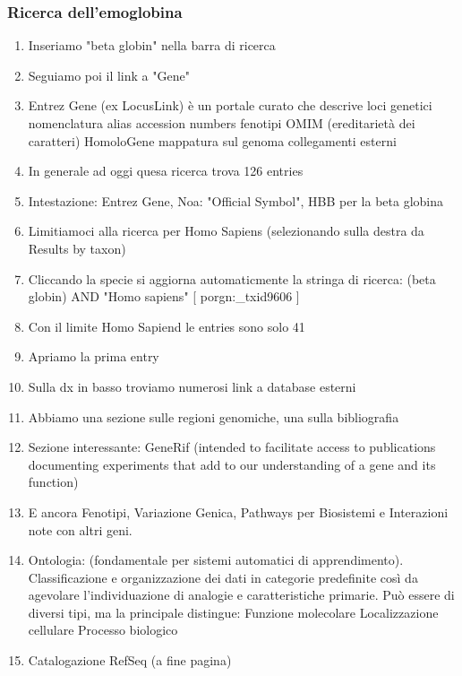 \documentclass{article}
\begin{document}
\subsubsection*{Ricerca dell'emoglobina}
\begin{enumerate}
    \item Inseriamo "beta globin" nella barra di ricerca
    \item Seguiamo poi il link a "Gene"
    \item Entrez Gene (ex LocusLink) è un portale curato che descrive loci genetici
        \subitem{-} nomenclatura
        \subitem{-} alias
        \subitem{-} accession numbers
        \subitem{-} fenotipi
        \subitem{-} OMIM (ereditarietà dei caratteri)
        \subitem{-} HomoloGene
        \subitem{-} mappatura sul genoma
        \subitem{-} collegamenti esterni
    \item In generale ad oggi quesa ricerca trova 126 entries
    \item Intestazione: Entrez Gene, Noa: "Official Symbol", HBB per la beta globina
    \item Limitiamoci alla ricerca per Homo Sapiens (selezionando sulla destra da Results by taxon)
    \item Cliccando la specie si aggiorna automaticmente la stringa di ricerca: {\ttfamily(beta globin) AND "Homo sapiens" [ porgn:\_txid9606 ]}
    \item Con il limite Homo Sapiend le entries sono solo 41
    \item Apriamo la prima entry
    \item Sulla dx in basso troviamo numerosi link a database esterni
    \item Abbiamo una sezione sulle regioni genomiche, una sulla bibliografia
    \item Sezione interessante: GeneRif (intended to facilitate access to publications documenting experiments that add to our understanding of a gene and its function)
    \item E ancora Fenotipi, Variazione Genica, Pathways per Biosistemi e Interazioni note con altri geni.
    \item Ontologia: (fondamentale per sistemi automatici di apprendimento). Classificazione
    e organizzazione dei dati in categorie predefinite così da agevolare l'individuazione di
    analogie e caratteristiche primarie. Può essere di diversi tipi, ma la principale distingue:
        \subitem{-} Funzione molecolare
        \subitem{-} Localizzazione cellulare
        \subitem{-} Processo biologico
    \item Catalogazione RefSeq (a fine pagina)
\end{enumerate}
\end{document}
